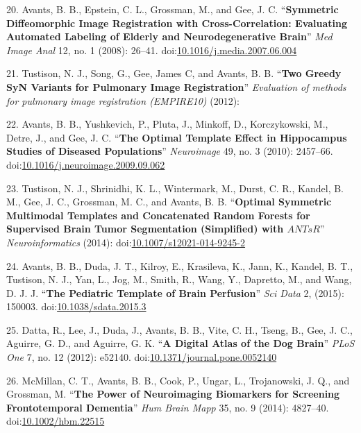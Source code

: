\documentclass[11pt,]{article}
\begin{document}
\hypertarget{ref-Avants:2008aa}{}
20. Avants, B. B., Epstein, C. L., Grossman, M., and Gee, J. C.
``\textbf{Symmetric Diffeomorphic Image Registration with
Cross-Correlation: Evaluating Automated Labeling of Elderly and
Neurodegenerative Brain}'' \emph{Med Image Anal} 12, no. 1 (2008):
26--41.
doi:\href{https://doi.org/10.1016/j.media.2007.06.004}{10.1016/j.media.2007.06.004}

\hypertarget{ref-Tustison:2012aa}{}
21. Tustison, N. J., Song, G., Gee, James C, and Avants, B. B.
``\textbf{Two Greedy SyN Variants for Pulmonary Image Registration}''
\emph{Evaluation of methods for pulmonary image registration (EMPIRE10)}
(2012):

\hypertarget{ref-Avants:2010aa}{}
22. Avants, B. B., Yushkevich, P., Pluta, J., Minkoff, D., Korczykowski,
M., Detre, J., and Gee, J. C. ``\textbf{The Optimal Template Effect in
Hippocampus Studies of Diseased Populations}'' \emph{Neuroimage} 49, no.
3 (2010): 2457--66.
doi:\href{https://doi.org/10.1016/j.neuroimage.2009.09.062}{10.1016/j.neuroimage.2009.09.062}

\hypertarget{ref-Tustison:2014aa}{}
23. Tustison, N. J., Shrinidhi, K. L., Wintermark, M., Durst, C. R.,
Kandel, B. M., Gee, J. C., Grossman, M. C., and Avants, B. B.
``\textbf{Optimal Symmetric Multimodal Templates and Concatenated Random
Forests for Supervised Brain Tumor Segmentation (Simplified) with
\(ANTsR\)}'' \emph{Neuroinformatics} (2014):
doi:\href{https://doi.org/10.1007/s12021-014-9245-2}{10.1007/s12021-014-9245-2}

\hypertarget{ref-Avants:2015aa}{}
24. Avants, B. B., Duda, J. T., Kilroy, E., Krasileva, K., Jann, K.,
Kandel, B. T., Tustison, N. J., Yan, L., Jog, M., Smith, R., Wang, Y.,
Dapretto, M., and Wang, D. J. J. ``\textbf{The Pediatric Template of
Brain Perfusion}'' \emph{Sci Data} 2, (2015): 150003.
doi:\href{https://doi.org/10.1038/sdata.2015.3}{10.1038/sdata.2015.3}

\hypertarget{ref-Datta:2012aa}{}
25. Datta, R., Lee, J., Duda, J., Avants, B. B., Vite, C. H., Tseng, B.,
Gee, J. C., Aguirre, G. D., and Aguirre, G. K. ``\textbf{A Digital Atlas
of the Dog Brain}'' \emph{PLoS One} 7, no. 12 (2012): e52140.
doi:\href{https://doi.org/10.1371/journal.pone.0052140}{10.1371/journal.pone.0052140}

\hypertarget{ref-McMillan:2014aa}{}
26. McMillan, C. T., Avants, B. B., Cook, P., Ungar, L., Trojanowski, J.
Q., and Grossman, M. ``\textbf{The Power of Neuroimaging Biomarkers for
Screening Frontotemporal Dementia}'' \emph{Hum Brain Mapp} 35, no. 9
(2014): 4827--40.
doi:\href{https://doi.org/10.1002/hbm.22515}{10.1002/hbm.22515}
\end{document}
